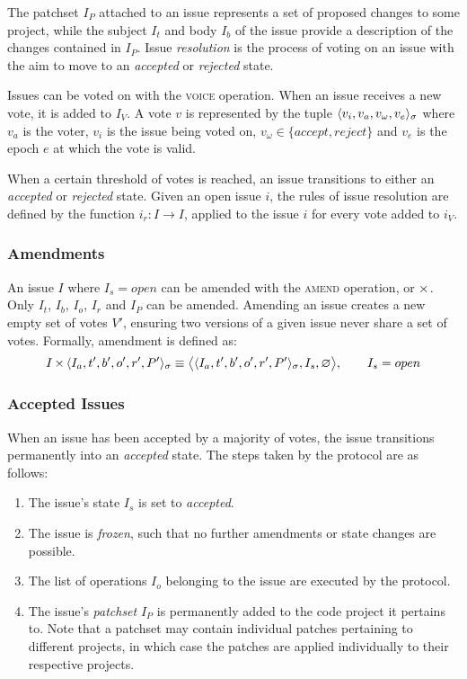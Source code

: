 The patchset $I_P$ attached to an issue represents a set of proposed changes to
some project, while the subject $I_t$ and body $I_b$ of the issue provide a
description of the changes contained in $I_P$. Issue \emph{resolution} is the
process of voting on an issue with the aim to move to an \emph{accepted} or
\emph{rejected} state.

Issues can be voted on with the \textsc{voice} operation. When an issue receives
a new vote, it is added to $I_V$. A vote $v$ is represented by the tuple
$\langle v_i, v_a, v_{\omega}, v_e \rangle_{\sigma}$ where $v_a$ is the voter,
$v_i$ is the issue being voted on, $v_{\omega} \in \{accept, reject\}$ and
$v_e$ is the epoch $e$ at which the vote is valid.

When a certain threshold of votes is reached, an issue transitions to either an
\emph{accepted} or \emph{rejected} state. Given an open issue $i$, the rules of
issue resolution are defined by the function $i_r : I \to I$, applied to the
issue $i$ for every vote added to $i_V$.

\subsubsection{Amendments}

An issue $I$ where $I_s = open$ can be amended with the \textsc{amend}
operation, or $\operatorname{\times}$. Only $I_t$, $I_b$, $I_o$, $I_r$ and $I_P$ can be
amended.  Amending an issue creates a new empty set of votes $V'$, ensuring two
versions of a given issue never share a set of votes. Formally, amendment is
defined as:
\begin{align*}
    I \operatorname{\times}{} \langle I_a, t', b', o', r', P' \rangle_{\sigma} \equiv
    \big<\langle I_a, t', b', o', r', P' \rangle_{\sigma}, I_s, \varnothing
    \big>, \qquad I_s = open
\end{align*}


\subsubsection{Accepted Issues} When an issue has been accepted by a majority
of votes, the issue transitions permanently into an \emph{accepted} state. The
steps taken by the protocol are as follows:

\begin{enumerate}
    \item The issue's state $I_s$ is set to \emph{accepted}.
    \item The issue is \emph{frozen}, such that no further amendments or state
        changes are possible.
    \item The list of operations $I_o$ belonging to the issue are executed by
        the protocol.
    \item The issue's \emph{patchset} $I_P$ is permanently added to the code
        project it pertains to. Note that a patchset may contain individual
        patches pertaining to different projects, in which case the patches are
        applied individually to their respective projects.
\end{enumerate}

